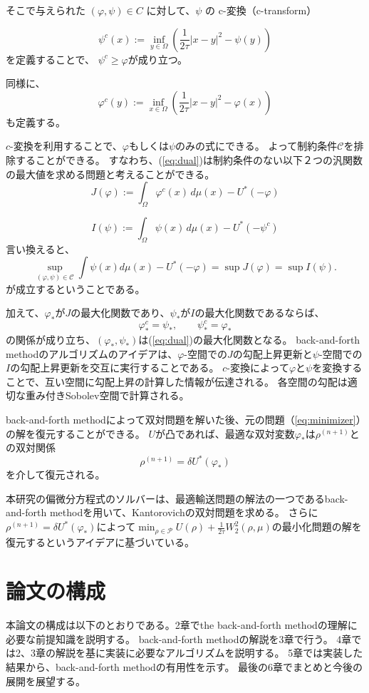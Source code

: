 そこで与えられた \((\varphi, \psi) \in C\) に対して、\(\psi\) の c-変換（c-transform）

\begin{equation*}
    \psi^c(x) := \inf_{y \in \Omega} \left( \frac{1}{2\tau}|x-y|^2 - \psi(y)\right)
\end{equation*}
を定義することで、
\(\psi^c \geq \varphi\)が成り立つ。

同様に、
\begin{equation*}
    \varphi^c(y) := \inf_{x \in \Omega} \left( \frac{1}{2\tau}|x-y|^2 - \varphi(x)\right)
\end{equation*}
も定義する。

$c$-変換を利用することで、$\varphi$もしくは$\psi$のみの式にできる。
よって制約条件$\mathcal{C}$を排除することができる。
すなわち、(\ref{eq:dual})は制約条件のない以下２つの汎関数の最大値を求める問題と考えることができる。
\begin{equation}
    \label{eq:J}
    J(\varphi):= \int_{\Omega} \varphi^c(x) \,d\mu(x) - U^*(- \varphi)
\end{equation}

\begin{equation}
    \label{eq:I}
    I(\psi):= \int_{\Omega} \psi(x) \, d\mu(x) - U^*(- \psi^{c})
\end{equation}
言い換えると、
\[
\sup_{(\varphi,\psi) \in \mathcal{C}} \int \psi(x) d\mu(x) - U^*(- \varphi) = \sup J(\varphi) = \sup I(\psi).
\]
が成立するということである。

加えて、$\varphi_*$が$J$の最大化関数であり、$\psi_*$が$I$の最大化関数であるならば、
\[
    \varphi_*^c = \psi_*, \qquad \psi_*^c = \varphi_*
\]
の関係が成り立ち、$(\varphi_*, \psi_*)$は(\ref{eq:dual})の最大化関数となる。
back-and-forth methodのアルゴリズムのアイデアは、$\varphi$-空間での$J$の勾配上昇更新と$\psi$-空間での$I$の勾配上昇更新を交互に実行することである。
$c$-変換によって$\varphi$と$\psi$を変換することで、互い空間に勾配上昇の計算した情報が伝達される。
各空間の勾配は適切な重み付きSobolev空間で計算される。

back-and-forth methodによって双対問題を解いた後、元の問題（\ref{eq:minimizer}）の解を復元することができる。
$U$が凸であれば、最適な双対変数$\varphi_*$は$\rho^{(n+1)}$との双対関係
$$
    \rho^{(n+1)} = \delta U^*(\varphi_*)
$$
を介して復元される。

本研究の偏微分方程式のソルバーは、最適輸送問題の解法の一つであるback-and-forth methodを用いて、Kantorovichの双対問題を求める。
さらに$\rho^{(n+1)} = \delta U^*(\varphi_*)$によって$\min_{\rho \in \mathcal{P}} U(\rho) + \frac{1}{2\tau} W_2^2(\rho, \mu)$の最小化問題の解を復元するというアイデアに基づいている。

\section{論文の構成}
\label{sect:論文の構成}
本論文の構成は以下のとおりである。2章でthe back-and-forth methodの理解に必要な前提知識を説明する。
back-and-forth methodの解説を3章で行う。
4章では2、3章の解説を基に実装に必要なアルゴリズムを説明する。
5章では実装した結果から、back-and-forth methodの有用性を示す。
最後の6章でまとめと今後の展開を展望する。